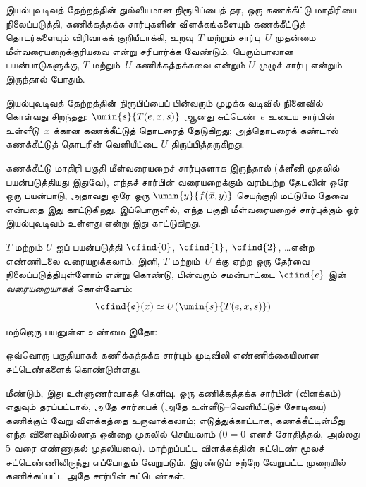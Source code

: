 \documentclass[../../../include/open-logic-section]{subfiles}
\begin{document}
\begin{explain}
இயல்புவடிவத் தேற்றத்தின் துல்லியமான நிரூபிப்பைத் தர, ஒரு கணக்கீட்டு
மாதிரியை நிலைப்படுத்தி, கணிக்கத்தக்க சார்புகளின் விளக்கங்களையும்
கணக்கீட்டுத் தொடர்களையும் விரிவாகக் குறியீடாக்கி, உறவு~$T$ மற்றும்
சார்பு~$U$ முதன்மை மீள்வரையறைக்குரியவை என்று சரிபார்க்க வேண்டும்.
பெரும்பாலான பயன்பாடுகளுக்கு, $T$ மற்றும்~$U$ கணிக்கத்தக்கவை என்றும்
$U$ முழுச் சார்பு என்றும் இருந்தால் போதும்.

இயல்புவடிவத் தேற்றத்தின் நிரூபிப்பைப் பின்வரும் முழக்க வடிவில்
நினைவில் கொள்வது சிறந்தது: $\umin{s}{T(e, x, s)}$ ஆனது
சுட்டெண்~$e$ உடைய சார்பின் உள்ளீடு~$x$ க்கான கணக்கீட்டுத் தொடரைத்
தேடுகிறது; அத்தொடரைக் கண்டால் கணக்கீட்டுத் தொடரின் வெளியீட்டை
$U$ திருப்பித்தருகிறது.
\end{explain}

கணக்கீட்டு மாதிரி பகுதி மீள்வரையறைச் சார்புகளாக இருந்தால்
(க்ளீனி முதலில் பயன்படுத்தியது இதுவே), எந்தச் சார்பின் வரையறைக்கும்
வரம்பற்ற தேடலின் ஒரே ஒரு பயன்பாடு, அதாவது ஒரே ஒரு
$\umin{y}{f(\vec x, y)}$ செயற்குறி மட்டுமே தேவை என்பதை இது
காட்டுகிறது. இப்பொருளில், எந்த பகுதி மீள்வரையறைச் சார்புக்கும் ஓர்
இயல்புவடிவம் உள்ளது என்று இது காட்டுகிறது.

$T$ மற்றும் $U$ ஐப் பயன்படுத்தி $\cfind{0}$, $\cfind{1}$,
$\cfind{2}$, \dots என்ற எண்ணிடலை வரையறுக்கலாம். இனி,
$T$ மற்றும்~$U$ க்கு ஏற்ற ஒரு தேர்வை நிலைப்படுத்தியுள்ளோம் என்று
கொண்டு, பின்வரும் சமன்பாட்டை $\cfind{e}$ இன்
\emph{வரையறையாகக்} கொள்வோம்:
\[
\cfind{e}(x) \simeq U(\umin{s}{T(e,x,s)})
\]

மற்றொரு பயனுள்ள உண்மை இதோ:

\begin{thm}
ஒவ்வொரு பகுதியாகக் கணிக்கத்தக்க சார்பும் முடிவிலி எண்ணிக்கையிலான
சுட்டெண்களைக் கொண்டுள்ளது.
\end{thm}

மீண்டும், இது உள்ளுணர்வாகத் தெளிவு. ஒரு கணிக்கத்தக்க சார்பின்
(விளக்கம்) எதுவும் தரப்பட்டால், அதே சார்பைக் (அதே உள்ளீடு--வெளியீட்டுச்
சோடியை) கணிக்கும் வேறு விளக்கத்தை உருவாக்கலாம்; எடுத்துக்காட்டாக,
கணக்கீட்டின்மீது எந்த விளைவுமில்லாத ஒன்றை முதலில் செய்யலாம்
($0 = 0$ எனச் சோதித்தல், அல்லது $5$ வரை எண்ணுதல் முதலியவை).
மாற்றப்பட்ட விளக்கத்தின் சுட்டெண் மூலச் சுட்டெண்ணிலிருந்து எப்போதும்
வேறுபடும். இரண்டும் சற்றே வேறுபட்ட முறையில் கணிக்கப்பட்ட அதே சார்பின்
சுட்டெண்கள்.
\end{document}
